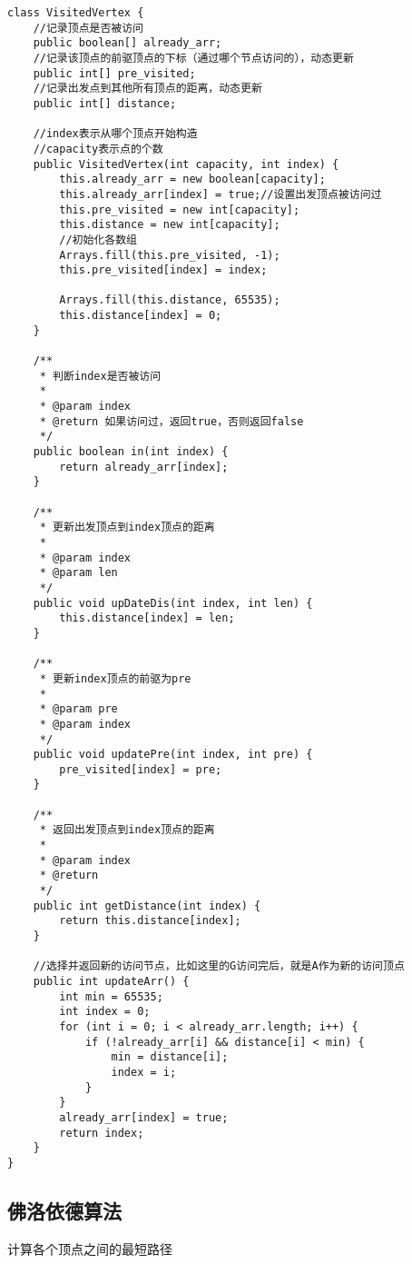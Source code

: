 \documentclass[a4paper]{report}
\begin{document}
\begin{lstlisting}
class VisitedVertex {
    //记录顶点是否被访问
    public boolean[] already_arr;
    //记录该顶点的前驱顶点的下标（通过哪个节点访问的），动态更新
    public int[] pre_visited;
    //记录出发点到其他所有顶点的距离，动态更新
    public int[] distance;

    //index表示从哪个顶点开始构造
    //capacity表示点的个数
    public VisitedVertex(int capacity, int index) {
        this.already_arr = new boolean[capacity];
        this.already_arr[index] = true;//设置出发顶点被访问过
        this.pre_visited = new int[capacity];
        this.distance = new int[capacity];
        //初始化各数组
        Arrays.fill(this.pre_visited, -1);
        this.pre_visited[index] = index;

        Arrays.fill(this.distance, 65535);
        this.distance[index] = 0;
    }

    /**
     * 判断index是否被访问
     *
     * @param index
     * @return 如果访问过，返回true，否则返回false
     */
    public boolean in(int index) {
        return already_arr[index];
    }

    /**
     * 更新出发顶点到index顶点的距离
     *
     * @param index
     * @param len
     */
    public void upDateDis(int index, int len) {
        this.distance[index] = len;
    }

    /**
     * 更新index顶点的前驱为pre
     *
     * @param pre
     * @param index
     */
    public void updatePre(int index, int pre) {
        pre_visited[index] = pre;
    }

    /**
     * 返回出发顶点到index顶点的距离
     *
     * @param index
     * @return
     */
    public int getDistance(int index) {
        return this.distance[index];
    }

    //选择并返回新的访问节点，比如这里的G访问完后，就是A作为新的访问顶点
    public int updateArr() {
        int min = 65535;
        int index = 0;
        for (int i = 0; i < already_arr.length; i++) {
            if (!already_arr[i] && distance[i] < min) {
                min = distance[i];
                index = i;
            }
        }
        already_arr[index] = true;
        return index;
    }
}
\end{lstlisting}
\subsection{佛洛依德算法}
计算各个顶点之间的最短路径
\end{document}
